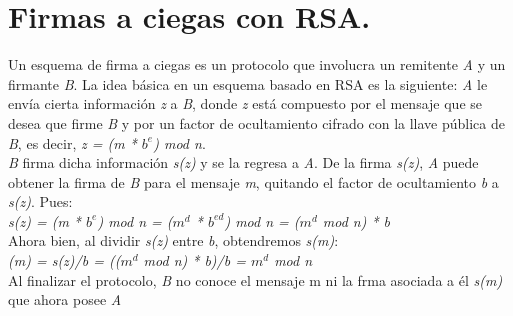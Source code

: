 
\section{Firmas a ciegas con RSA. }

Un esquema de firma a ciegas es un protocolo que involucra un remitente \textit{A} y un firmante \textit{B}. La idea básica en un esquema basado en RSA es la siguiente: \textit{A} le envía cierta información \textit{z} a \textit{B}, donde \textit{z} está compuesto por el mensaje que se desea que firme \textit{B} y por un factor de ocultamiento cifrado con la llave pública de \textit{B}, es decir, \textit{z = (m *  $b^{e}$) mod n}.  \\
\textit{B} firma dicha información \textit{s(z)} y se la regresa a \textit{A}. De la firma \textit{s(z)}, \textit{A} puede obtener la firma de \textit{B} para el mensaje \textit{m}, quitando el factor de ocultamiento \textit{b} a \textit{s(z)}. Pues: \\

\textit{s(z) = (m *  $b^{e}$) mod n = ($m^{d}$ *  $b^{ed}$) mod n = ($m^{d}$ mod n) * b} \\

Ahora bien, al dividir \textit{s(z)} entre \textit{b}, obtendremos \textit{s(m)}: \\

\textit{(m) = s(z)/b = (($m^{d}$ mod n) * b)/b = $m^{d}$ mod n} \\

Al finalizar el protocolo, \textit{B} no conoce el mensaje m ni la frma asociada a él \textit{s(m)} que ahora posee \textit{A} ~\cite{ciegas} \\






